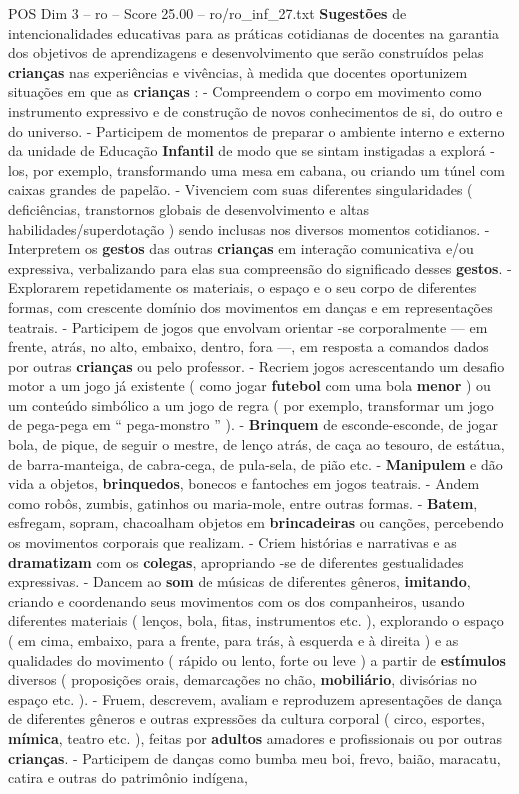 \begin{textsample}{POS Dim 3 – ro – Score 25.00 – ro/ro\_inf\_27.txt}  \label{ex:f3_pos_135}
\textbf{Sugestões} de intencionalidades educativas para as práticas cotidianas de docentes na garantia dos objetivos de aprendizagens e desenvolvimento que serão construídos pelas \textbf{crianças} nas experiências e vivências, à medida que docentes oportunizem situações em que as \textbf{crianças} : - Compreendem o corpo em movimento como instrumento expressivo e de construção de novos conhecimentos de si, do outro e do universo. - Participem de momentos de preparar o ambiente interno e externo da unidade de Educação \textbf{Infantil} de modo que se sintam instigadas a explorá -los, por exemplo, transformando uma mesa em cabana, ou criando um túnel com caixas grandes de papelão. - Vivenciem com suas diferentes singularidades ( deficiências, transtornos globais de desenvolvimento e altas habilidades/superdotação ) sendo inclusas nos diversos momentos cotidianos. - Interpretem os \textbf{gestos} das outras \textbf{crianças} em interação comunicativa e/ou expressiva, verbalizando para elas sua compreensão do significado desses \textbf{gestos}. - Explorarem repetidamente os materiais, o espaço e o seu corpo de diferentes formas, com crescente domínio dos movimentos em danças e em representações teatrais. - Participem de jogos que envolvam orientar -se corporalmente — em frente, atrás, no alto, embaixo, dentro, fora —, em resposta a comandos dados por outras \textbf{crianças} ou pelo professor. - Recriem jogos acrescentando um desafio motor a um jogo já existente ( como jogar \textbf{futebol} com uma bola \textbf{menor} ) ou um conteúdo simbólico a um jogo de regra ( por exemplo, transformar um jogo de pega-pega em “ pega-monstro ” ). - \textbf{Brinquem} de esconde-esconde, de jogar bola, de pique, de seguir o mestre, de lenço atrás, de caça ao tesouro, de estátua, de barra-manteiga, de cabra-cega, de pula-sela, de pião etc. - \textbf{Manipulem} e dão vida a objetos, \textbf{brinquedos}, bonecos e fantoches em jogos teatrais. - Andem como robôs, zumbis, gatinhos ou maria-mole, entre outras formas. - \textbf{Batem}, esfregam, sopram, chacoalham objetos em \textbf{brincadeiras} ou canções, percebendo os movimentos corporais que realizam. - Criem histórias e narrativas e as \textbf{dramatizam} com os \textbf{colegas}, apropriando -se de diferentes gestualidades expressivas. - Dancem ao \textbf{som} de músicas de diferentes gêneros, \textbf{imitando}, criando e coordenando seus movimentos com os dos companheiros, usando diferentes materiais ( lenços, bola, fitas, instrumentos etc. ), explorando o espaço ( em cima, embaixo, para a frente, para trás, à esquerda e à direita ) e as qualidades do movimento ( rápido ou lento, forte ou leve ) a partir de \textbf{estímulos} diversos ( proposições orais, demarcações no chão, \textbf{mobiliário}, divisórias no espaço etc. ). - Fruem, descrevem, avaliam e reproduzem apresentações de dança de diferentes gêneros e outras expressões da cultura corporal ( circo, esportes, \textbf{mímica}, teatro etc. ), feitas por \textbf{adultos} amadores e profissionais ou por outras \textbf{crianças}. - Participem de danças como bumba meu boi, frevo, baião, maracatu, catira e outras do patrimônio indígena, 
\end{textsample}
